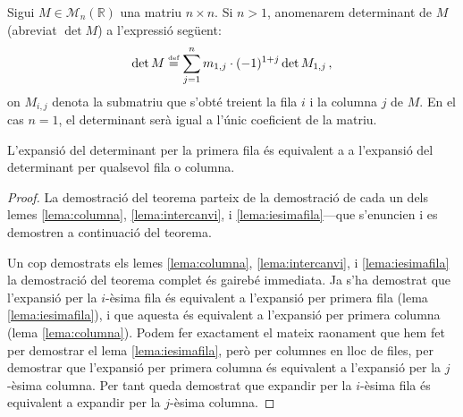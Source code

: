 
\newcommand{\bl}{\color{blue}}
\newcommand{\rd}{\color{red}}
\newcommand{\gre}{\color{ForestGreen}}

\newcommand{\ucarr}{\mathbin{\text{\rotatebox[origin=c]{270}{$\curvearrowleft$}}}}
\newcommand{\dcarr}{\mathbin{\text{\rotatebox[origin=c]{270}{$\curvearrowright$}}}}

\begin{defi}[determinant]
	Sigui $M \in \mathcal{M}_n(\mathbb{R})$ una matriu $n\times n$. Si $n>1$, anomenarem determinant de $M$ (abreviat $\det M$) a l'expressió següent:
	\[
		\det M \stackrel{\text{\tiny def}}{=} \sum_{j=1}^{n} m_{1,j}\cdot(-1)^{1+j}\det M_{1,j}  \,,
	\]
	on $M_{i,j}$ denota la submatriu que s'obté treient la fila $i$ i la columna $j$ de $M$. En el cas $n=1$, el determinant serà igual a l'únic coeficient de la matriu.
\end{defi}

\begin{teo}\label{teo:laplace}
	L'expansió del determinant per la primera fila és equivalent a a l'expansió del determinant per qualsevol fila o columna.
	
\end{teo}

\begin{proof}
	La demostració del teorema parteix de la demostració de cada un dels lemes \ref{lema:columna}, \ref{lema:intercanvi}, i \ref{lema:iesimafila}---que s'enuncien i es demostren a continuació del teorema.
	
	Un cop demostrats els lemes \ref{lema:columna}, \ref{lema:intercanvi}, i \ref{lema:iesimafila} la demostració del teorema complet és gairebé immediata. Ja s'ha demostrat que l'expansió per la $i$-èsima fila és equivalent a l'expansió per primera fila (lema \ref{lema:iesimafila}), i que aquesta és equivalent a l'expansió per primera columna (lema \ref{lema:columna}). Podem fer exactament el mateix raonament que hem fet per demostrar el lema \ref{lema:iesimafila}, però per columnes en lloc de files, per demostrar que l'expansió per primera columna és equivalent a l'expansió per la $j$-èsima columna. Per tant queda demostrat que expandir per la $i$-èsima fila és equivalent a expandir per la $j$-èsima columna.
\end{proof}

